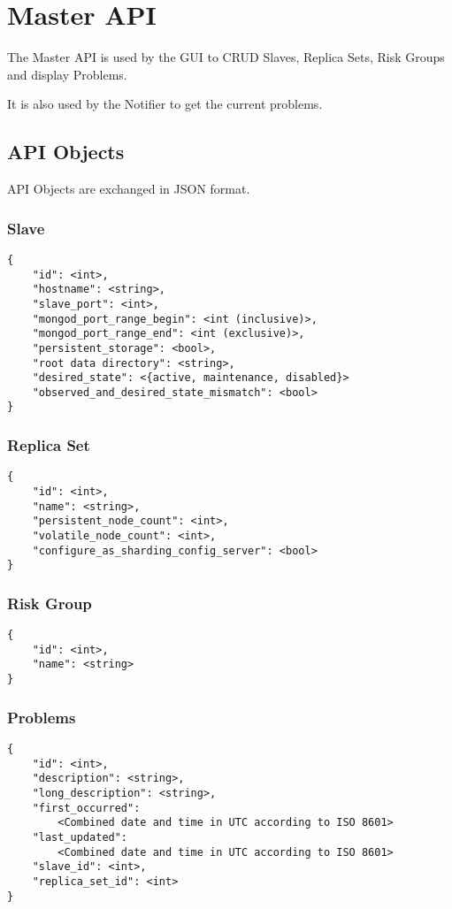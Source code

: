 \section{Master API}
\renewcommand{\gocurpackage}{masterapi}
The Master API is used by the GUI to CRUD Slaves, Replica Sets, Risk Groups and display Problems.

It is also used by the Notifier to get the current problems.
\subsection{API Objects}
API Objects are exchanged in JSON format.
\subsubsection{Slave}
\begin{lstlisting}
{
	"id": <int>,
	"hostname": <string>,
	"slave_port": <int>,
	"mongod_port_range_begin": <int (inclusive)>,
	"mongod_port_range_end": <int (exclusive)>,
	"persistent_storage": <bool>,
	"root data directory": <string>,
	"desired_state": <{active, maintenance, disabled}>
	"observed_and_desired_state_mismatch": <bool>
}
\end{lstlisting}
\subsubsection{Replica Set}
\begin{lstlisting}
{
	"id": <int>,
	"name": <string>,
	"persistent_node_count": <int>,
	"volatile_node_count": <int>,
	"configure_as_sharding_config_server": <bool>
}
\end{lstlisting}
\subsubsection{Risk Group}
\begin{lstlisting}
{
	"id": <int>,
	"name": <string>
}
\end{lstlisting}
\subsubsection{Problems}
\begin{lstlisting}
{
	"id": <int>,
	"description": <string>,
	"long_description": <string>,
	"first_occurred": 
		<Combined date and time in UTC according to ISO 8601>
	"last_updated": 
		<Combined date and time in UTC according to ISO 8601>
	"slave_id": <int>,
	"replica_set_id": <int>
}
\end{lstlisting}
